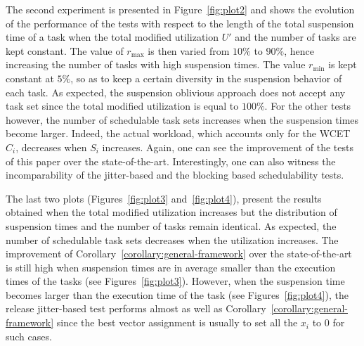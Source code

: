 The second experiment is presented in Figure~\ref{fig:plot2} and shows the evolution of the performance of the tests with respect to the length of the total suspension time of a task when the total modified utilization $U'$ and the number of tasks are kept constant. The value of $r_{\max}$ is then varied from $10\%$ to $90\%$, hence increasing the number of tasks with high suspension times. The value $r_{\min}$ is kept constant at $5\%$, so as to keep a certain diversity in the suspension behavior of each task. As expected, the suspension oblivious approach does not accept any task set since the total modified utilization is equal to $100\%$. For the other tests however, the number of schedulable task sets increases when the suspension times become larger. Indeed, the actual workload, which accounts only for the WCET $C_i$, decreases when $S_i$ increases. Again, one can see the improvement of the tests of this paper over the state-of-the-art. Interestingly, one can also witness the incomparability of the jitter-based and the blocking based schedulability tests. %

The last two plots (Figures~\ref{fig:plot3} and~\ref{fig:plot4}), present the results obtained when the total modified utilization increases but the distribution of suspension times and the number of tasks remain identical. As expected, the number of schedulable task sets decreases when the utilization increases.
The improvement of Corollary~\ref{corollary:general-framework} over the state-of-the-art is still high when suspension times are in average smaller than the execution times of the tasks (see Figures~\ref{fig:plot3}). However, when the suspension time becomes larger than the execution time of the task (see Figures~\ref{fig:plot4}), the release jitter-based test performs almost as well as Corollary~\ref{corollary:general-framework} since the best vector assignment is usually to set all the $x_i$ to $0$ for such cases.


